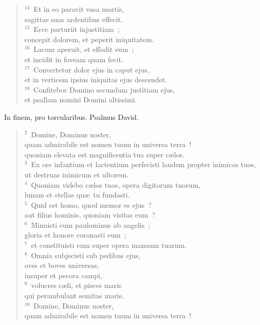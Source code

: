 \begin{flushleft}
\begin{verse}
${}^{14}$~Et in eo paravit vasa mortis,\\ sagittas suas ardentibus effecit.\\
${}^{15}$~Ecce parturiit injustitiam~;\\ concepit dolorem, et peperit iniquitatem.\\
${}^{16}$~Lacum aperuit, et effodit eum~;\\ et incidit in foveam quam fecit.\\
${}^{17}$~Convertetur dolor ejus in caput ejus,\\ et in verticem ipsius iniquitas ejus descendet.\\
${}^{18}$~Confitebor Domino secundum justitiam ejus,\\ et psallam nomini Domini altissimi.\end{verse}\end{flushleft}



\lettrine[lines=3,image=true,loversize=0.05,lraise=-0.03]{I}{}n finem, pro torcularibus. Psalmus David.
\begin{flushleft}\begin{verse}\vspace{6pt}${}^{2}$~Domine, Dominus noster,\\ quam admirabile est nomen tuum in universa terra~!\\ quoniam elevata est magnificentia tua super c\ae los.\\
${}^{3}$~Ex ore infantium et lactentium perfecisti laudem propter inimicos tuos,\\ ut destruas inimicum et ultorem.\\
${}^{4}$~Quoniam videbo c\ae los tuos, opera digitorum tuorum,\\ lunam et stellas qu\ae\ tu fundasti.\\
${}^{5}$~Quid est homo, quod memor es ejus~?\\ aut filius hominis, quoniam visitas eum~?\\
${}^{6}$~Minuisti eum paulominus ab angelis~;\\ gloria et honore coronasti eum~;\\
${}^{7}$~et constituisti eum super opera manuum tuarum.\\
${}^{8}$~Omnia subjecisti sub pedibus ejus,\\ oves et boves universas,\\ insuper et pecora campi,\\
${}^{9}$~volucres c\ae li, et pisces maris\\ qui perambulant semitas maris.\\
${}^{10}$~Domine, Dominus noster,\\ quam admirabile est nomen tuum in universa terra~!\end{verse}\end{flushleft}



